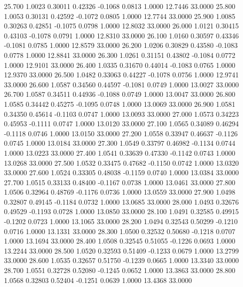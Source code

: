   25.700   1.0023   0.30011   0.42326  -0.1068   0.0813   1.0000  12.7446  33.0000
  25.800   1.0053   0.30131   0.42592  -0.1072   0.0805   1.0000  12.7744  33.0000
  25.900   1.0085   0.30263   0.42851  -0.1075   0.0798   1.0000  12.8032  33.0000
  26.000   1.0121   0.30415   0.43103  -0.1078   0.0791   1.0000  12.8310  33.0000
  26.100   1.0160   0.30597   0.43346  -0.1081   0.0785   1.0000  12.8579  33.0000
  26.200   1.0206   0.30829   0.43580  -0.1083   0.0778   1.0000  12.8841  33.0000
  26.300   1.0261   0.31151   0.43802  -0.1084   0.0772   1.0000  12.9101  33.0000
  26.400   1.0335   0.31670   0.44014  -0.1083   0.0765   1.0000  12.9370  33.0000
  26.500   1.0482   0.33063   0.44227  -0.1078   0.0756   1.0000  12.9741  33.0000
  26.600   1.0587   0.34560   0.44597  -0.1081   0.0749   1.0000  13.0027  33.0000
  26.700   1.0587   0.34511   0.44936  -0.1088   0.0749   1.0000  13.0047  33.0000
  26.800   1.0585   0.34442   0.45275  -0.1095   0.0748   1.0000  13.0069  33.0000
  26.900   1.0581   0.34350   0.45614  -0.1103   0.0747   1.0000  13.0093  33.0000
  27.000   1.0573   0.34223   0.45953  -0.1111   0.0747   1.0000  13.0120  33.0000
  27.100   1.0565   0.34089   0.46294  -0.1118   0.0746   1.0000  13.0150  33.0000
  27.200   1.0558   0.33947   0.46637  -0.1126   0.0745   1.0000  13.0184  33.0000
  27.300   1.0549   0.33797   0.46982  -0.1134   0.0744   1.0000  13.0223  33.0000
  27.400   1.0541   0.33639   0.47330  -0.1142   0.0743   1.0000  13.0268  33.0000
  27.500   1.0532   0.33475   0.47682  -0.1150   0.0742   1.0000  13.0320  33.0000
  27.600   1.0524   0.33305   0.48038  -0.1159   0.0740   1.0000  13.0384  33.0000
  27.700   1.0515   0.33133   0.48400  -0.1167   0.0738   1.0000  13.0461  33.0000
  27.800   1.0506   0.32964   0.48769  -0.1176   0.0736   1.0000  13.0559  33.0000
  27.900   1.0498   0.32807   0.49145  -0.1184   0.0732   1.0000  13.0685  33.0000
  28.000   1.0493   0.32676   0.49529  -0.1193   0.0728   1.0000  13.0850  33.0000
  28.100   1.0491   0.32585   0.49915  -0.1202   0.0723   1.0000  13.1065  33.0000
  28.200   1.0494   0.32543   0.50299  -0.1210   0.0716   1.0000  13.1331  33.0000
  28.300   1.0500   0.32532   0.50680  -0.1218   0.0707   1.0000  13.1694  33.0000
  28.400   1.0508   0.32545   0.51055  -0.1226   0.0693   1.0000  13.2244  33.0000
  28.500   1.0520   0.32593   0.51409  -0.1233   0.0679   1.0000  13.2799  33.0000
  28.600   1.0535   0.32657   0.51750  -0.1239   0.0665   1.0000  13.3340  33.0000
  28.700   1.0551   0.32728   0.52080  -0.1245   0.0652   1.0000  13.3863  33.0000
  28.800   1.0568   0.32803   0.52404  -0.1251   0.0639   1.0000  13.4368  33.0000
